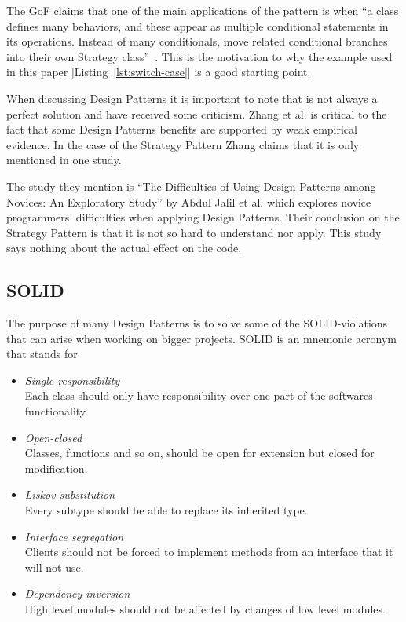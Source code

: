 \documentclass[conference, a4paper]{IEEEtran}
\begin{document}
The GoF claims that one of the main applications of the pattern is when ``a class defines many behaviors, and these appear as multiple conditional statements in its operations. Instead of many conditionals, move related conditional branches into their own Strategy class''~\cite{bibitem:GoF}. This is the motivation to why the example used in this paper [Listing~\ref{lst:switch-case}] is a good starting point.

When discussing Design Patterns it is important to note that is not always a perfect solution and have received some criticism. Zhang et al. is critical to the fact that some Design Patterns benefits are supported by weak empirical evidence. In the case of the Strategy Pattern Zhang claims that it is only mentioned in one study.~\cite{bibitem:Zhang}

The study they mention is ``The Difficulties of Using Design Patterns among Novices: An Exploratory Study'' by Abdul Jalil et al. which explores novice programmers' difficulties when applying Design Patterns. Their conclusion on the Strategy Pattern is that it is not so hard to understand nor apply. This study says nothing about the actual effect on the code.~\cite{bibitem:Jalil}

\subsection{SOLID}
The purpose of many Design Patterns is to solve some of the SOLID-violations that can arise when working on bigger projects. SOLID is an mnemonic acronym that stands for
\begin{itemize}
    \item \emph{Single responsibility} \\
    Each class should only have responsibility over one part of the softwares functionality.
    \item \emph{Open-closed} \\
    Classes, functions and so on, should be open for extension but closed for modification.
    \item \emph{Liskov substitution} \\
    Every subtype should be able to replace its inherited type.
    \item \emph{Interface segregation} \\
    Clients should not be forced to implement methods from an interface that it will not use.
    \item \emph{Dependency inversion} \\
    High level modules should not be affected by changes of low level modules.
\end{itemize}
\end{document}
